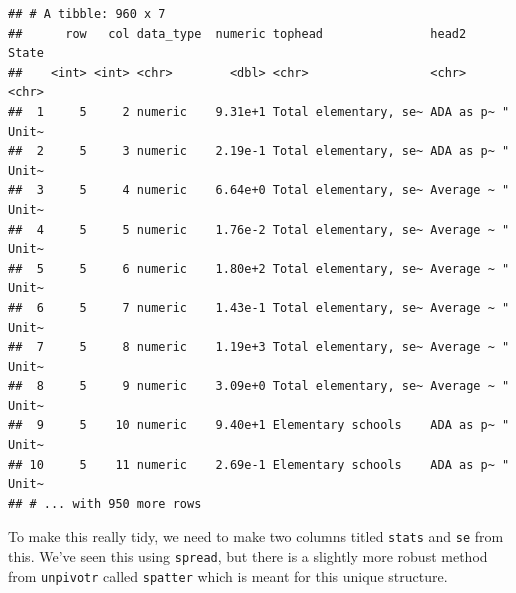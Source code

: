\documentclass[12pt,letterpaperpaper,openany]{book}
\newenvironment{Shaded}{\begin{snugshade}}{\end{snugshade}}
\newcommand{\DataTypeTok}[1]{\textcolor[rgb]{0.13,0.29,0.53}{#1}}
\newcommand{\DecValTok}[1]{\textcolor[rgb]{0.00,0.00,0.81}{#1}}
\newcommand{\KeywordTok}[1]{\textcolor[rgb]{0.13,0.29,0.53}{\textbf{#1}}}
\newcommand{\NormalTok}[1]{#1}
\newcommand{\OperatorTok}[1]{\textcolor[rgb]{0.81,0.36,0.00}{\textbf{#1}}}
\newcommand{\StringTok}[1]{\textcolor[rgb]{0.31,0.60,0.02}{#1}}
\begin{document}
\begin{verbatim}
## # A tibble: 960 x 7
##      row   col data_type  numeric tophead               head2     State    
##    <int> <int> <chr>        <dbl> <chr>                 <chr>     <chr>    
##  1     5     2 numeric    9.31e+1 Total elementary, se~ ADA as p~ "   Unit~
##  2     5     3 numeric    2.19e-1 Total elementary, se~ ADA as p~ "   Unit~
##  3     5     4 numeric    6.64e+0 Total elementary, se~ Average ~ "   Unit~
##  4     5     5 numeric    1.76e-2 Total elementary, se~ Average ~ "   Unit~
##  5     5     6 numeric    1.80e+2 Total elementary, se~ Average ~ "   Unit~
##  6     5     7 numeric    1.43e-1 Total elementary, se~ Average ~ "   Unit~
##  7     5     8 numeric    1.19e+3 Total elementary, se~ Average ~ "   Unit~
##  8     5     9 numeric    3.09e+0 Total elementary, se~ Average ~ "   Unit~
##  9     5    10 numeric    9.40e+1 Elementary schools    ADA as p~ "   Unit~
## 10     5    11 numeric    2.69e-1 Elementary schools    ADA as p~ "   Unit~
## # ... with 950 more rows
\end{verbatim}

To make this really tidy, we need to make two columns titled \texttt{stats} and \texttt{se} from this.
We've seen this using \texttt{spread}, but there is a slightly more robust method from \texttt{unpivotr} called
\texttt{spatter} which is meant for this unique structure.

\begin{Shaded}
\end{Shaded}
\end{document}
